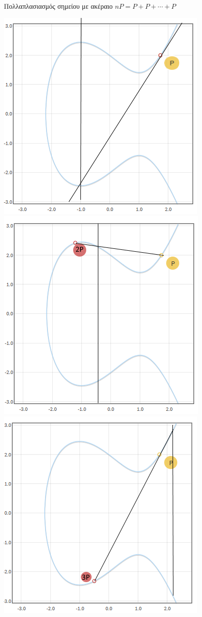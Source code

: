 \documentclass[handout]{beamer}
\begin{document}
\begin{frame}{Πολλαπλασιασμός σημείου με ακέραιο $nP = P + P + \cdots + P$}

\begin{center}
\includegraphics[scale=0.33]{p.png} 
\pause
\includegraphics[scale=0.33]{2p.png} \\
\pause
\includegraphics[scale=0.33]{3p.png} 

\end{center}
\end{frame}
\end{document}
